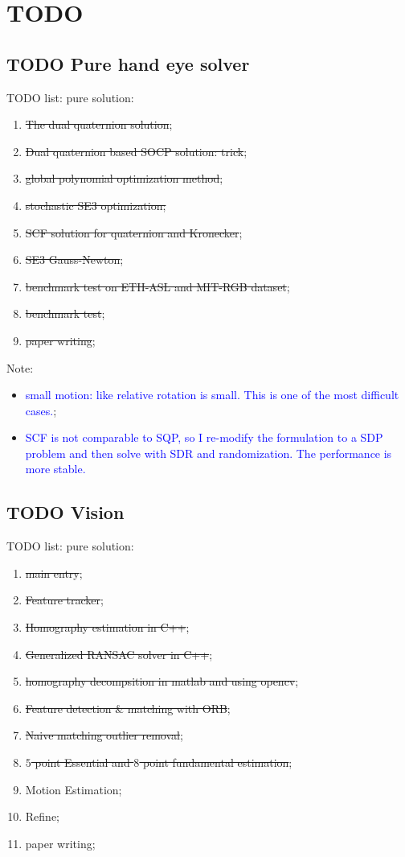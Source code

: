 \documentclass[a4paper]{report}
\begin{document}
\chapter{TODO}
\section{TODO Pure hand eye solver}
TODO list:
pure solution:
\begin{enumerate}
	\item \sout{The dual quaternion solution};
	\item \sout{Dual quaternion based SOCP solution: trick};
	\item \sout{global polynomial optimization method};
	\item \sout{stochastic SE3 optimization;}
	\item \sout{SCF solution for quaternion and Kronecker};
	\item \sout{SE3 Gauss-Newton};
	\item \sout{benchmark test on ETH-ASL and MIT-RGB dataset};
	\item \sout{benchmark test};
	\item \sout{paper writing};
\end{enumerate}
Note: 
\begin{itemize}
\item \textcolor{blue}{small motion: like relative rotation is small. This is one of the most difficult cases.};
\item \textcolor{blue}{SCF is not comparable to SQP, so I re-modify the formulation to a SDP problem and then solve with SDR and randomization. The performance is more stable.}
\end{itemize}

\section{TODO Vision}
TODO list:
pure solution:
\begin{enumerate}
	\item \sout{main entry};
	\item \sout{Feature tracker};
	\item \sout{Homography estimation in C++};
	\item \sout{Generalized RANSAC solver in C++};
	\item \sout{homography decompsition in matlab and using opencv};
	\item \sout{Feature detection \& matching with ORB};
	\item \sout{Naive matching outlier removal};
	\item \sout{$5$ point Essential and $8$ point fundamental estimation};
	\item Motion Estimation;
	\item Refine;
	\item paper writing;
\end{enumerate}
\end{document}
